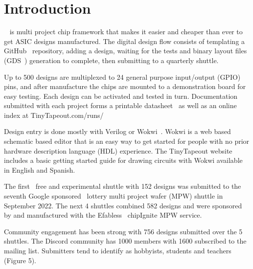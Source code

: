 \section{Introduction}
\label{sec:introduction}
~\cite{tinytapeout} is multi project chip framework that makes it easier and cheaper than ever to get ASIC designs manufactured.
The digital design flow consists of templating a GitHub~\cite{github} repository, adding a design, waiting for the tests and binary layout files (GDS~\cite{gds}) generation to complete, then submitting to a quarterly shuttle.

Up to 500 designs are multiplexed to 24 general purpose input/output (GPIO) pins, and after manufacture the chips are mounted to a demonstration board for easy testing.
Each design can be activated and tested in turn.
Documentation submitted with each project forms a printable datasheet~\cite{datasheet} as well as an online index at TinyTapeout.com/runs/~\cite{tinytapeoutruns}

Design entry is done mostly with Verilog or Wokwi~\cite{wokwi}.
Wokwi is a web based schematic based editor that is an easy way to get started for people with no prior hardware description language (HDL) experience.
The TinyTapeout website includes a basic getting started guide for drawing circuits with Wokwi available in English and Spanish.

The first~\cite{firstshuttle} free and experimental shuttle with 152 designs was submitted to the seventh Google sponsored~\cite{googlesponsored} lottery multi project wafer (MPW) shuttle in September 2022.
The next 4 shuttles combined 582 designs and were sponsored by and manufactured with the Efabless~\cite{efabless} chipIgnite MPW service.

Community engagement has been strong with 756 designs submitted over the 5 shuttles.
The Discord community has 1000 members with 1600 subscribed to the mailing list. Submitters tend to identify as hobbyists, students and teachers (Figure 5).

